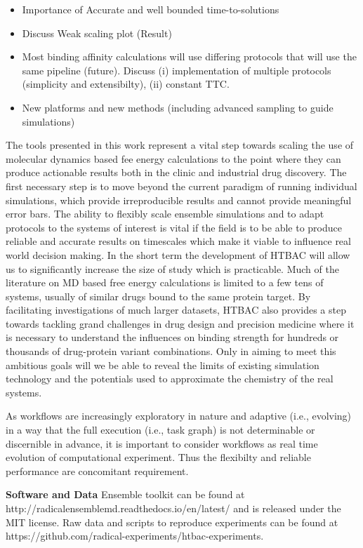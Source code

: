 
\begin{itemize}
	\item  Importance of Accurate and well bounded time-to-solutions 

	\item  Discuss Weak scaling plot (Result)

	\item  Most binding affinity calculations will use differing protocols that will use the same pipeline (future). Discuss (i) implementation of multiple protocols  (simplicity and extensibilty), (ii) constant TTC.

	\item  New platforms and new methods (including advanced sampling to guide simulations)

\end{itemize}


The tools presented in this work represent a vital step towards scaling the use of molecular
dynamics based fee energy calculations to the point where they can produce actionable 
results both in the clinic and industrial drug discovery.
The first necessary step is to move beyond the current paradigm of running individual simulations, 
which provide irreproducible results and cannot provide meaningful error bars.
The ability to flexibly scale ensemble simulations and to adapt protocols to the systems of 
interest is vital if the field is to be able to produce reliable and accurate results on 
timescales which make it viable to influence real world decision making.
In the short term the development of HTBAC will allow us to significantly increase the size of 
study which is practicable.
Much of the literature on MD based free energy calculations is limited to a few tens of systems, 
usually of similar drugs bound to the same protein target.
By facilitating investigations of much larger datasets, HTBAC also provides a step towards 
tackling grand challenges in drug design and precision medicine where it is necessary to understand 
the influences on binding strength for hundreds or thousands of drug-protein variant combinations.
Only in aiming to meet this ambitious goals will we be able to reveal the limits of existing simulation 
technology and the potentials used to approximate the chemistry of the real systems.

As workflows are increasingly exploratory in nature and adaptive (i.e.,
evolving) in a way that the full execution (i.e., task graph) is not
determinable or discernible in advance, it is important to consider 
workflows as real time evolution of computational experiment. Thus the
flexibilty and reliable performance are concomitant requirement.

\textbf{Software and Data} Ensemble toolkit can be found at http://radicalensemblemd.readthedocs.io/en/latest/ and is released under the MIT license. Raw data and scripts to reproduce experiments can be found at https://github.com/radical-experiments/htbac-experiments.
